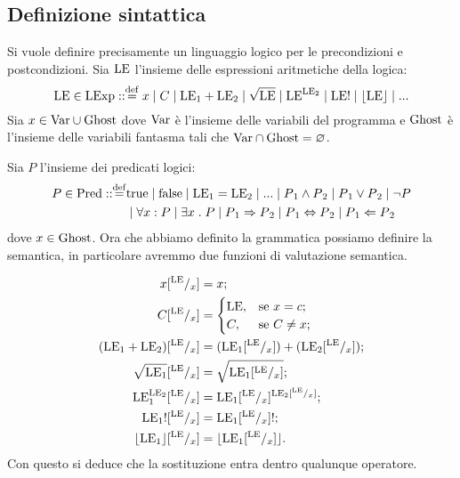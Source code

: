 \subsection{Definizione sintattica}
Si vuole definire precisamente un linguaggio logico per le precondizioni e postcondizioni. Sia $\mathrm{LE}$ l'insieme delle espressioni aritmetiche della logica:
\[
\LE \in \LExp \itc\itc\defeq x \mid C \mid \LE{_1} + \LE{_2} \mid \sqrt{\LE} \mid \LE^{\LE{_2}} \mid \LE! \mid                   \lfloor \LE \rfloor \mid ...
\]
Sia $x\in\mathrm{Var}\cup\mathrm{Ghost}$ dove $\mathrm{Var}$ è l'insieme delle variabili del programma e $\mathrm{Ghost}$ è l'insieme delle variabili fantasma tali che $\mathrm{Var}\cap\mathrm{Ghost} = \varnothing$.

Sia $P$ l'insieme dei predicati logici:
\begin{align*}
P \in \Pred \itc\itc\defeq &\true \mid\false\mid\LE{_1} = \LE{_2}\mid ...\mid P{_1} \wedge P{_2} \mid P{_1} \vee P{_2} \mid \neg P\\
&\mid \forall x \itc P\mid \exists x \st P\mid P{_1} \Rightarrow P{_2} \mid P{_1} \Leftrightarrow P{_2} \mid P{_1} \Leftarrow P{_2}
\end{align*}
dove $ x \in\mathrm{Ghost}$. Ora che abbiamo definito la grammatica possiamo definire la semantica, in particolare avremmo due funzioni di valutazione semantica.
\begin{definizione} 
\end{definizione}
\begin{align*}
   x [^{\mathrm{LE}}/_ x ]
    &=  x ;\\
   C[^{\mathrm{LE}}/_ x ]
    &=
      \begin{cases}
        \mathrm{LE}, &\text{se $x  =  c$;} \\
        C,   &\text{se $C \neq  x$;}
      \end{cases} \\
  (\mathrm{LE}_1 + \mathrm{LE}_2)[^{\mathrm{LE}}/_ x ] 
     &= (\mathrm{LE}_1[^{\mathrm{LE}}/_x]) + (\mathrm{LE}_2[^{\mathrm{LE}}/_x]);\\
  \sqrt{\mathrm{LE}_1}[^{\mathrm{LE}}/_x] 
     &= \sqrt{{\mathrm{LE}_1}[^{\mathrm{LE}}/_x]};\\
  \mathrm{LE}_1^{\mathrm{LE}{_2}}[^{\mathrm{LE}}/_x] 
     &= \mathrm{LE}_1[^{\mathrm{LE}}/_x]^{\mathrm{LE}{_2}[^{\mathrm{LE}}/_ x ]};\\
  {\mathrm{LE}_1}![^{\mathrm{LE}}/_ x ] 
     &= {{\mathrm{LE}_1}[^{\mathrm{LE}}/_ x ]}!;\\
  \lfloor \mathrm{LE}_1 \rfloor[^{\mathrm{LE}}/_ x] 
     &= \lfloor \mathrm{LE}_1[^{\mathrm{LE}}/_x] \rfloor.\\
\end{align*}
Con questo si deduce che la sostituzione entra dentro qualunque operatore.
